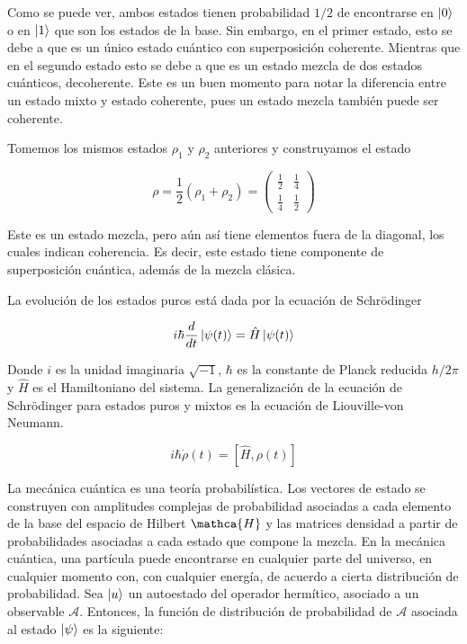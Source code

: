 Como se puede ver, ambos estados tienen probabilidad $1/2$ de encontrarse en $\ket{0}$ o en $\ket{1}$ que son los estados de la base. Sin embargo, en el primer estado, esto se debe a que es un único estado cuántico con superposición coherente. Mientras que en el segundo estado esto se debe a que es un estado mezcla de dos estados cuánticos, decoherente. Este es un buen momento para notar la diferencia entre un estado mixto y estado coherente, pues un estado mezcla también puede ser coherente.

Tomemos los mismos estados $\rho_1$ y $\rho_2$ anteriores y construyamos el estado

\begin{equation}
    \rho = \frac{1}{2} (\rho_1 + \rho_2) =
    \begin{pmatrix}
        \frac{1}{2} & \frac{1}{4} \\
        \frac{1}{4} & \frac{1}{2}
    \end{pmatrix}
\end{equation}

Este es un estado mezcla, pero aún así tiene elementos fuera de la diagonal, los cuales indican coherencia. Es decir, este estado tiene componente de superposición cuántica, además de la mezcla clásica.

La evolución de los estados puros está dada por la ecuación de Schrödinger 

\begin{equation}
    i \hbar \frac{d}{dt} \ket{\psi(t)} = \hat{H} \ket{\psi(t)}
\end{equation}

Donde $i$ es la unidad imaginaria $\sqrt{-1}$, $\hbar$ es la constante de Planck reducida $h/2\pi$ y $\hat{H}$ es el Hamiltoniano del sistema. La generalización de la ecuación de Schrödinger para estados puros y mixtos es la ecuación de Liouville-von Neumann.

\begin{equation}
    i \hbar \dot{\rho}(t) = [\hat{H}, \rho(t)]
\end{equation}

La mecánica cuántica es una teoría probabilística. Los vectores de estado se construyen con amplitudes complejas de probabilidad asociadas a cada elemento de la base del espacio de Hilbert $\mathca{H}$ y las matrices densidad a partir de probabilidades asociadas a cada estado que compone la mezcla. En la mecánica cuántica, una partícula puede encontrarse en cualquier parte del universo, en cualquier momento con, con cualquier energía, de acuerdo a cierta distribución de probabilidad. Sea $\ket{u}$ un autoestado del operador hermítico, asociado a un observable $\mathcal{A}$. Entonces, la función de distribución de probabilidad de $\mathcal{A}$ asociada al estado $\ket{\psi}$ es la siguiente:

